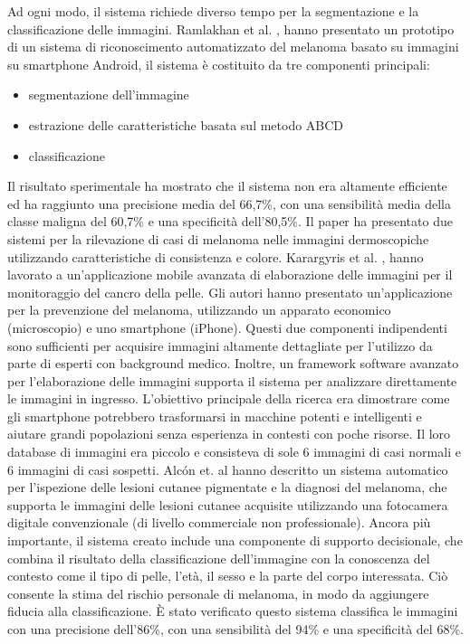 {	Ad ogni modo, il sistema richiede diverso tempo per la segmentazione e la classificazione delle immagini.
	\newline
	\newline
	Ramlakhan et al. \cite{ramlakhan2011mobile}, hanno presentato un prototipo di un sistema di riconoscimento automatizzato del melanoma basato su immagini su smartphone Android, il sistema è costituito da tre componenti principali:
	\begin{itemize}
		\item segmentazione dell'immagine
		\item estrazione delle caratteristiche basata sul metodo ABCD
		\item classificazione
	\end{itemize}
	 Il risultato sperimentale ha mostrato che il sistema non era altamente efficiente ed ha raggiunto una precisione media del 66,7\%, con una sensibilità media della classe maligna del 60,7\% e una specificità dell'80,5\%.
	 \newline
	 Il paper ha presentato due sistemi per la rilevazione di casi di melanoma nelle immagini dermoscopiche utilizzando caratteristiche di consistenza e colore.
	 \newline
	 \newline
	 Karargyris et al. \cite{karargyris2012derma}, hanno lavorato a un'applicazione mobile avanzata di elaborazione delle immagini per il monitoraggio del cancro della pelle. Gli autori hanno presentato un'applicazione per la prevenzione del melanoma, utilizzando un apparato economico (microscopio) e uno smartphone (iPhone). Questi due componenti indipendenti sono sufficienti per acquisire immagini altamente dettagliate per l'utilizzo da parte di esperti con background medico. Inoltre, un framework software avanzato per l'elaborazione delle immagini supporta il sistema per analizzare direttamente le immagini in ingresso.
	 \newline
	 L'obiettivo principale della ricerca era dimostrare come gli smartphone potrebbero trasformarsi in macchine potenti e intelligenti e aiutare grandi popolazioni senza esperienza in contesti con poche risorse. Il loro database di immagini era piccolo e consisteva di sole 6 immagini di casi normali e 6 immagini di casi sospetti.
	 \newline
	 \newline
	 Alcón et. al \cite{alcon2009automatic} hanno descritto un sistema automatico per l'ispezione delle lesioni cutanee pigmentate e la diagnosi del melanoma, che supporta le immagini delle lesioni cutanee acquisite utilizzando una fotocamera digitale convenzionale (di livello commerciale non professionale). Ancora più importante, il sistema creato include una componente di supporto decisionale, che combina il risultato della classificazione dell'immagine con la conoscenza del contesto come il tipo di pelle, l'età, il sesso e la parte del corpo interessata. Ciò consente la stima del rischio personale di melanoma, in modo da aggiungere fiducia alla classificazione. È stato verificato questo sistema classifica le immagini con una precisione dell'86\%, con una sensibilità del 94\% e una specificità del 68\%.
}
